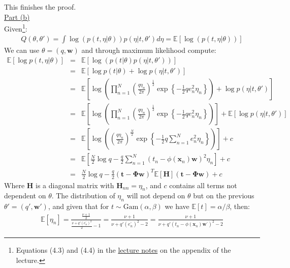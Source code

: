 \documentclass[a4paper, 11pt]{article}
\begin{document}
This finishes the proof.\\
\newline \underline{Part (b)}\\
\newline Given\footnote{Equations (4.3) and (4.4) in the \href{http://www.econ.upf.edu/~omiros/notes2005.pdf}{lecture notes} on the appendix of the lecture.}:
\begin{eqnarray}
Q(\theta, \theta') = \int \log \left( p(t, \eta | \theta) \right) p(\eta | t, \theta') d\eta = \mathbb{E}\left[ \log \left( p(t, \eta | \theta) \right) \right] \nonumber
\end{eqnarray}
We can use $\theta = (q, \mathbf{w})$ and through maximum likelihood compute:
\begin{eqnarray}
\mathbb{E}\left[ \log p(t, \eta | \theta) \right] &=& \mathbb{E}\left[ \log \left( p(t | \theta) p(\eta | t, \theta') \right) \right] \nonumber \\
&=& \mathbb{E}\left[ \log p(t | \theta) +\log p(\eta | t, \theta') \right] \nonumber \\
&=& \mathbb{E}\left[ \log \left( \prod_{n=1}^{N} \left( \frac{q \eta_n}{2 \pi} \right)^{\frac{1}{2}} \exp \left\{ -\frac{1}{2} q e_n^2 \eta_n \right\}  \right) +\log p(\eta | t, \theta') \right] \nonumber \\
&=& \mathbb{E}\left[ \log \left( \prod_{n=1}^{N} \left( \frac{q \eta_n}{2 \pi} \right)^{\frac{1}{2}} \exp \left\{ -\frac{1}{2} q e_n^2 \eta_n \right\}  \right)  \right] + \mathbb{E}\left[ \log p(\eta | t, \theta') \right] \nonumber \\
&=& \mathbb{E}\left[ \log \left( \left( \frac{q \eta_n}{2 \pi} \right)^{\frac{N}{2}} \exp \left\{ -\frac{1}{2} q \sum_{n=1}^{N} e_n^2 \eta_n \right\}  \right) \right] + c \nonumber \\
&=& \mathbb{E}\left[ \frac{N}{2} \log q - \frac{q}{2} \sum_{n=1}^{N} (t_n - \phi(\mathbf{x}_n) \mathbf{w})^2 \eta_n \right] + c \nonumber \\
&=& \frac{N}{2} \log q - \frac{q}{2} (\mathbf{t} - \mathbf{\Phi} \mathbf{w})^T \mathbb{E}\left[ \mathbf{H} \right] (\mathbf{t} - \mathbf{\Phi} \mathbf{w}) + c \nonumber
\end{eqnarray}
Where $\mathbf{H}$ is a diagonal matrix with $\mathbf{H}_{nn} = \eta_n$, and $c$ contains all terms not dependent on $\theta$. The distribution of $\eta_n$ will not depend on $\theta$ but on the previous $\theta' = (q', \mathbf{w}')$, and given that for $t \sim \text{Gam}(\alpha, \beta)$ we have $\mathbb{E}[t] = \alpha / \beta$, then:
\begin{eqnarray}
\mathbb{E}[\eta_n] = \frac{\frac{\nu + 1}{2}}{ \frac{\nu + q' (e_{n}^{'})^2}{2} - 1} = \frac{\nu + 1}{\nu + q' (e_{n}^{'})^2 - 2} = \frac{\nu + 1}{\nu + q' (t_n - \phi(\mathbf{x}_{n}) \mathbf{w}^{'})^2 - 2} \nonumber
\end{eqnarray}
\end{document}
